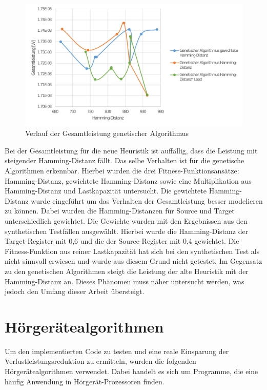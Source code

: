 \begin{figure}[H]
	\centering
	\includegraphics[width=\textwidth]{fig/totalpower_genetic.pdf}
	\caption{Verlauf der Gesamtleistung genetischer Algorithmus}
	\label{fig:totalpower_genetic}
\end{figure}

Bei der Gesamtleistung für die neue Heuristik ist auffällig, dass die Leistung mit steigender Hamming-Distanz fällt. Das selbe Verhalten ist für die genetische Algorithmen erkennbar. Hierbei wurden die drei Fitness-Funktionsans\"atze: Hamming-Distanz, gewichtete Hamming-Distanz sowie eine Multiplikation aus Hamming-Distanz und Lastkapazit\"at untersucht. Die gewichtete Hamming-Distanz wurde eingef\"uhrt um das Verhalten der Gesamtleistung besser modelieren zu k\"onnen. Dabei wurden die Hamming-Distanzen f\"ur Source und Target unterschiedlich gewichtet. Die Gewichte wurden mit den Ergebnissen aus den synthetischen Testf\"allen ausgew\"ahlt. Hierbei wurde die Hamming-Distanz der Target-Register mit 0,6 und die der Source-Register mit 0,4 gewichtet. Die Fitness-Funktion aus reiner Lastkapazit\"at hat sich bei den synthetischen Test als nicht sinnvoll erwiesen und wurde aus diesem Grund nicht getestet.
Im Gegensatz zu den genetischen Algorithmen steigt die Leistung der alte Heuristik mit der Hamming-Distanz an. Dieses Phänomen muss näher untersucht werden, was jedoch den Umfang dieser Arbeit übersteigt.

\section{Hörgerätealgorithmen}
\label{sec:testprogamme}
Um den implementierten Code zu testen und eine reale Einsparung der Verlustleistungsreduktion zu ermitteln, wurden die folgenden Hörgerätealgorithmen verwendet. Dabei handelt es sich um Programme, die eine häufig Anwendung in Hörgerät-Prozessoren finden.

